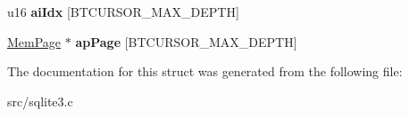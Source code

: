 \begin{DoxyCompactItemize}
\item 
\hypertarget{struct_bt_cursor_a037a739198de5bee22ca203d34e90af1}{u16 {\bfseries ai\-Idx} \mbox{[}B\-T\-C\-U\-R\-S\-O\-R\-\_\-\-M\-A\-X\-\_\-\-D\-E\-P\-T\-H\mbox{]}}\label{struct_bt_cursor_a037a739198de5bee22ca203d34e90af1}

\item 
\hypertarget{struct_bt_cursor_ad3414d944f9578e86e26c6158f92096b}{\hyperlink{struct_mem_page}{Mem\-Page} $\ast$ {\bfseries ap\-Page} \mbox{[}B\-T\-C\-U\-R\-S\-O\-R\-\_\-\-M\-A\-X\-\_\-\-D\-E\-P\-T\-H\mbox{]}}\label{struct_bt_cursor_ad3414d944f9578e86e26c6158f92096b}

\end{DoxyCompactItemize}


The documentation for this struct was generated from the following file\-:\begin{DoxyCompactItemize}
\item 
src/sqlite3.\-c\end{DoxyCompactItemize}
